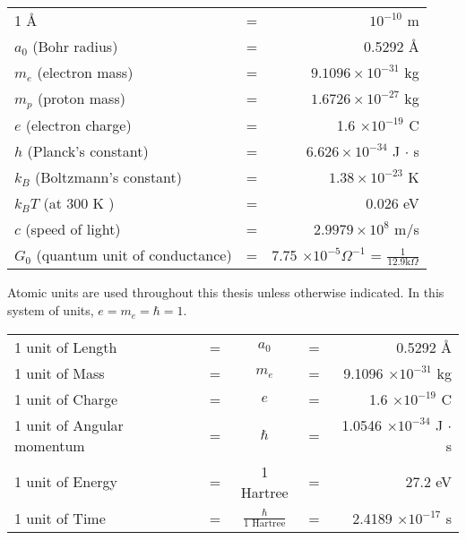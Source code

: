 
\begin{tabular}{lcr}
1 \AA & = & $ 10^{-10} $ m \\
$a_0 $ (Bohr radius) & = & 0.5292 \AA \\
$m_e $ (electron mass) & = & $ 9.1096 \times 10^{-31} $ kg \\
$m_p $ (proton mass) & = & $ 1.6726 \times 10^{-27} $ kg \\
$e$ (electron charge) & = & 1.6 $ \times 10^{-19}  $ C \\
$h$ (Planck's constant) & = & $ 6.626 \times 10^{-34} $ J $\cdot$ s \\
$k_B $ (Boltzmann's constant) & = & $ 1.38 \times 10^{-23} $ K \\
$k_B T $ (at $300 $ K ) & = & $ 0.026 $ eV \\
$c$ (speed of light) & = & $ 2.9979 \times 10^8 $ m/s \\
$G_0 $ (quantum unit of conductance) & = & 7.75 $\times 10^{-5} \Omega^{-1}$ =
$\frac{1}{12.9 \mbox{k}\Omega}$\\
\end{tabular}

\vspace{1.0in}

Atomic units are used throughout this thesis unless otherwise indicated.
In this system of units, $ e = m_e = \hbar = 1 $.

\vspace{1.0cm}

\begin{tabular}{lcccr}
1 unit of Length & = & $ a_0 $  & = & 0.5292 \AA \\
1 unit of Mass & = & $ m_e $  & = & 9.1096 $\times 10^{-31}$ kg \\
1 unit of Charge & = & $ e $  & = & 1.6 $\times 10^{-19}$ C \\
1 unit of Angular momentum & = & $ \hbar $ & = & 1.0546 $ \times 10^{-34} $ J $\cdot$ s \\
1 unit of Energy & = & 1 Hartree & = & 27.2 eV \\
1 unit of Time & = & $ \frac{\hbar}{\mbox{1 Hartree}}$  & = & 2.4189 $ \times 10^{-17}$ s \\
\end{tabular}


